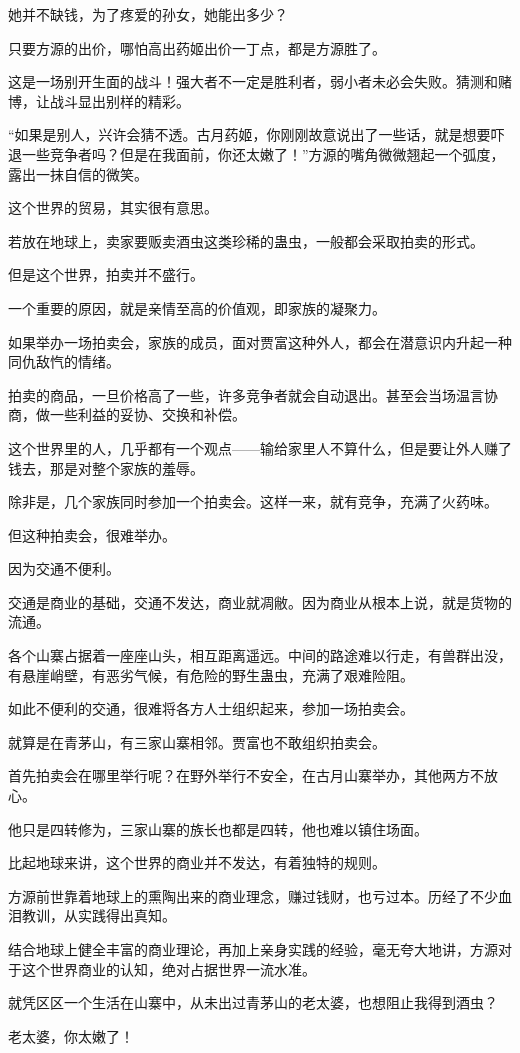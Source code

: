 \begin{this_body}
她并不缺钱，为了疼爱的孙女，她能出多少？

只要方源的出价，哪怕高出药姬出价一丁点，都是方源胜了。

这是一场别开生面的战斗！强大者不一定是胜利者，弱小者未必会失败。猜测和赌博，让战斗显出别样的精彩。

“如果是别人，兴许会猜不透。古月药姬，你刚刚故意说出了一些话，就是想要吓退一些竞争者吗？但是在我面前，你还太嫩了！”方源的嘴角微微翘起一个弧度，露出一抹自信的微笑。

这个世界的贸易，其实很有意思。

若放在地球上，卖家要贩卖酒虫这类珍稀的蛊虫，一般都会采取拍卖的形式。

但是这个世界，拍卖并不盛行。

一个重要的原因，就是亲情至高的价值观，即家族的凝聚力。

如果举办一场拍卖会，家族的成员，面对贾富这种外人，都会在潜意识内升起一种同仇敌忾的情绪。

拍卖的商品，一旦价格高了一些，许多竞争者就会自动退出。甚至会当场温言协商，做一些利益的妥协、交换和补偿。

这个世界里的人，几乎都有一个观点——输给家里人不算什么，但是要让外人赚了钱去，那是对整个家族的羞辱。

除非是，几个家族同时参加一个拍卖会。这样一来，就有竞争，充满了火药味。

但这种拍卖会，很难举办。

因为交通不便利。

交通是商业的基础，交通不发达，商业就凋敝。因为商业从根本上说，就是货物的流通。

各个山寨占据着一座座山头，相互距离遥远。中间的路途难以行走，有兽群出没，有悬崖峭壁，有恶劣气候，有危险的野生蛊虫，充满了艰难险阻。

如此不便利的交通，很难将各方人士组织起来，参加一场拍卖会。

就算是在青茅山，有三家山寨相邻。贾富也不敢组织拍卖会。

首先拍卖会在哪里举行呢？在野外举行不安全，在古月山寨举办，其他两方不放心。

他只是四转修为，三家山寨的族长也都是四转，他也难以镇住场面。

比起地球来讲，这个世界的商业并不发达，有着独特的规则。

方源前世靠着地球上的熏陶出来的商业理念，赚过钱财，也亏过本。历经了不少血泪教训，从实践得出真知。

结合地球上健全丰富的商业理论，再加上亲身实践的经验，毫无夸大地讲，方源对于这个世界商业的认知，绝对占据世界一流水准。

就凭区区一个生活在山寨中，从未出过青茅山的老太婆，也想阻止我得到酒虫？

老太婆，你太嫩了！

\end{this_body}

